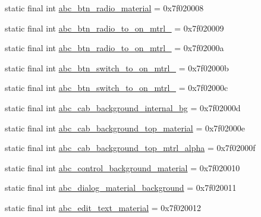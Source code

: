 \begin{CompactItemize}
\item 
static final int \hyperlink{classandroid_1_1support_1_1graphics_1_1drawable_1_1animated_1_1_r_1_1drawable_cf59fc39123b4d2cc2faa5efb103b26a}{abc\_\-btn\_\-radio\_\-material} = 0x7f020008
\item 
static final int \hyperlink{classandroid_1_1support_1_1graphics_1_1drawable_1_1animated_1_1_r_1_1drawable_afc7c30cc1e6e5435569efc148d4cc53}{abc\_\-btn\_\-radio\_\-to\_\-on\_\-mtrl\_} = 0x7f020009
\item 
static final int \hyperlink{classandroid_1_1support_1_1graphics_1_1drawable_1_1animated_1_1_r_1_1drawable_301fc0cf4c0f23bfbdb47c0bcf5bae0a}{abc\_\-btn\_\-radio\_\-to\_\-on\_\-mtrl\_} = 0x7f02000a
\item 
static final int \hyperlink{classandroid_1_1support_1_1graphics_1_1drawable_1_1animated_1_1_r_1_1drawable_6027b6f7cf17cf3137d7162208c92457}{abc\_\-btn\_\-switch\_\-to\_\-on\_\-mtrl\_} = 0x7f02000b
\item 
static final int \hyperlink{classandroid_1_1support_1_1graphics_1_1drawable_1_1animated_1_1_r_1_1drawable_d636e7da325e63fe12d73045c527add8}{abc\_\-btn\_\-switch\_\-to\_\-on\_\-mtrl\_} = 0x7f02000c
\item 
static final int \hyperlink{classandroid_1_1support_1_1graphics_1_1drawable_1_1animated_1_1_r_1_1drawable_6b1ee0a1ff5edabf656ae32dbcb599dd}{abc\_\-cab\_\-background\_\-internal\_\-bg} = 0x7f02000d
\item 
static final int \hyperlink{classandroid_1_1support_1_1graphics_1_1drawable_1_1animated_1_1_r_1_1drawable_6e169471e6a3c13f7bcb6889b5c4b4fe}{abc\_\-cab\_\-background\_\-top\_\-material} = 0x7f02000e
\item 
static final int \hyperlink{classandroid_1_1support_1_1graphics_1_1drawable_1_1animated_1_1_r_1_1drawable_b539a148296828b479e694eed3e5267e}{abc\_\-cab\_\-background\_\-top\_\-mtrl\_\-alpha} = 0x7f02000f
\item 
static final int \hyperlink{classandroid_1_1support_1_1graphics_1_1drawable_1_1animated_1_1_r_1_1drawable_186c1c36306553a7c9430664b5894e98}{abc\_\-control\_\-background\_\-material} = 0x7f020010
\item 
static final int \hyperlink{classandroid_1_1support_1_1graphics_1_1drawable_1_1animated_1_1_r_1_1drawable_ee495440ca80e0c5edce8707e18a47cb}{abc\_\-dialog\_\-material\_\-background} = 0x7f020011
\item 
static final int \hyperlink{classandroid_1_1support_1_1graphics_1_1drawable_1_1animated_1_1_r_1_1drawable_ea900b801d6be418dcce14175660cc14}{abc\_\-edit\_\-text\_\-material} = 0x7f020012

\end{CompactItemize}
